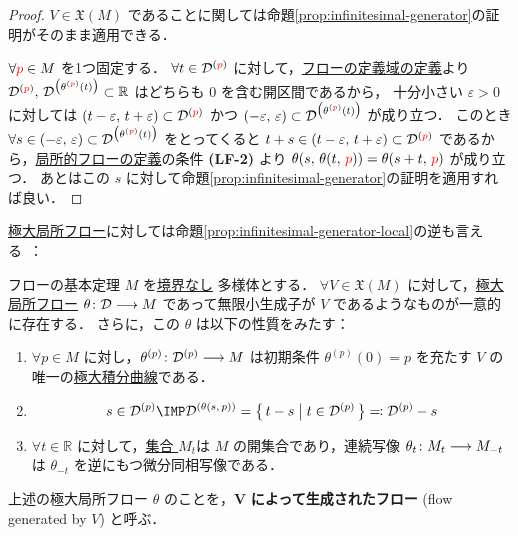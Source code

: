 \documentclass[geometry_main]{subfiles}
\begin{document}
\begin{proof}
    $V \in \mathfrak{X}(M)$ であることに関しては命題\ref{prop:infinitesimal-generator}の証明がそのまま適用できる．

    $\forall \textcolor{red}{p} \in M$ を1つ固定する． 
    $\forall t \in \mathcal{D}^{(\textcolor{red}{p})}$ に対して，\hyperref[def:local-flow]{フローの定義域の定義}より $\mathcal{D}^{(\textcolor{red}{p})},\, \mathcal{D}^{\bigl(\theta^{(\textcolor{red}{p})}(t)\bigr)} \subset \mathbb{R}$ はどちらも $0$ を含む開区間であるから，
    十分小さい $\varepsilon > 0$ に対しては $(t - \varepsilon,\, t + \varepsilon) \subset \mathcal{D}^{(\textcolor{red}{p})}$ かつ $(-\varepsilon,\, \varepsilon) \subset \mathcal{D}^{\bigl(\theta^{(\textcolor{red}{p})}(t)\bigr)}$ が成り立つ．
    このとき $\forall s \in (-\varepsilon,\, \varepsilon) \subset \mathcal{D}^{\bigl(\theta^{(\textcolor{red}{p})}(t)\bigr)}$ をとってくると $t + s \in (t - \varepsilon,\, t + \varepsilon) \subset \mathcal{D}^{(\textcolor{red}{p})}$ であるから，\hyperref[def:local-flow]{局所的フローの定義}の条件 \textbf{\textsf{(LF-2)}} より $\theta(s,\, \theta(t,\, \textcolor{red}{p})) = \theta(s+t,\, \textcolor{red}{p})$ が成り立つ．
    あとはこの $s$ に対して命題\ref{prop:infinitesimal-generator}の証明を適用すれば良い．
\end{proof}

\hyperref[def:local-flow]{極大局所フロー}に対しては命題\ref{prop:infinitesimal-generator-local}の逆も言える~\cite[p.212, Theorem 9.12]{Lee2012smooth}：

\begin{mytheo}[label=thm:fundamental-flow,breakable]{フローの基本定理}
    $M$ を\underline{境界なし} \cinfty 多様体とする．
    $\forall V \in \mathfrak{X}(M)$ に対して，\hyperref[def:local-flow]{極大局所フロー} $\theta \colon \mathcal{D} \longrightarrow M$ であって無限小生成子が $V$ であるようなものが一意的に存在する．
    さらに，この $\theta$ は以下の性質をみたす：
    \begin{enumerate}
        \item $\forall p \in M$ に対し，$\theta^{(p)} \colon \mathcal{D}^{(p)} \longrightarrow M$ は初期条件 $\theta^{(p)}(0) = p$ を充たす $V$ の唯一の\hyperref[def:local-flow]{極大積分曲線}である．
        \item 
        \begin{align}
            s \in \mathcal{D}^{(p)} \IMP \mathcal{D}^{(\theta(s,\, p))} = \bigl\{\, t - s \bigm| t \in \mathcal{D}^{(p)} \,\bigr\} \eqqcolon \mathcal{D}^{(p)} - s
        \end{align}
        \item $\forall t \in \mathbb{R}$ に対して，\hyperref[def:local-flow]{集合 $M_t$}は $M$ の開集合であり，連続写像 $\theta_t \colon M_t \longrightarrow M_{-t}$ は $\theta_{-t}$ を逆にもつ微分同相写像である．
    \end{enumerate}
    \tcblower
    上述の極大局所フロー $\theta$ のことを，$\bm{V}$ \textbf{によって生成されたフロー} (flow generated by $V$) と呼ぶ．
\end{mytheo}
\end{document}
